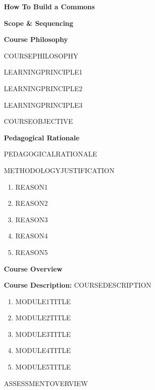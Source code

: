 \documentclass{article}
\begin{document}
	
{\huge \textbf{How To Build a Commons}}

\vspace{1cm}

{\Large \textbf{Scope \& Sequencing}}

\vspace{1cm}

{\huge \textbf{Course Philosophy}}
\vspace{1cm}

COURSEPHILOSOPHY

LEARNINGPRINCIPLE1

LEARNINGPRINCIPLE2

LEARNINGPRINCIPLE3

COURSEOBJECTIVE

\pagebreak

{\huge \textbf{Pedagogical Rationale}}
\vspace{1cm}

PEDAGOGICALRATIONALE

METHODOLOGYJUSTIFICATION

\begin{enumerate}
\item REASON1

\item REASON2

\item REASON3

\item REASON4

\item REASON5
 
\end{enumerate}

\pagebreak

{\huge \textbf{Course Overview}}
\vspace{1cm}

\textbf{Course Description:} COURSEDESCRIPTION

\begin{enumerate}
\item MODULE1TITLE

\item MODULE2TITLE

\item MODULE3TITLE

\item MODULE4TITLE

\item MODULE5TITLE
\end{enumerate}

ASSESSMENTOVERVIEW
\end{document}
